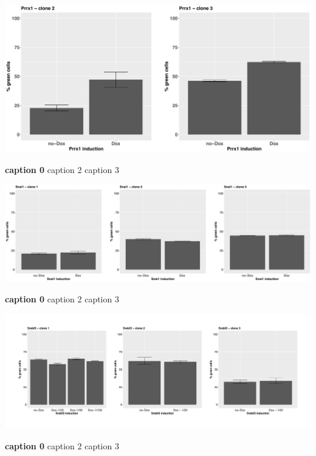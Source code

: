 \begin{suppfigure}[p]  
    \centering
    \includegraphics[width=\linewidth]{figures/hedgehog/SuppFigure17.png}
    \caption[caption1]{
        \textbf{caption 0}
        caption 2
        caption 3   
    }
    \label{fig:hh_figureS17}
\end{suppfigure}


\begin{suppfigure}[p]  
    \centering
    \includegraphics[width=\linewidth]{figures/hedgehog/SuppFigure18.png}
    \caption[caption1]{
        \textbf{caption 0}
        caption 2
        caption 3   
    }
    \label{fig:hh_figureS18}
\end{suppfigure}


\begin{suppfigure}[p]  
    \centering
    \includegraphics[width=\linewidth]{figures/hedgehog/SuppFigure19.png}
    \caption[caption1]{
        \textbf{caption 0}
        caption 2
        caption 3   
    }
    \label{fig:hh_figureS19}
\end{suppfigure}


